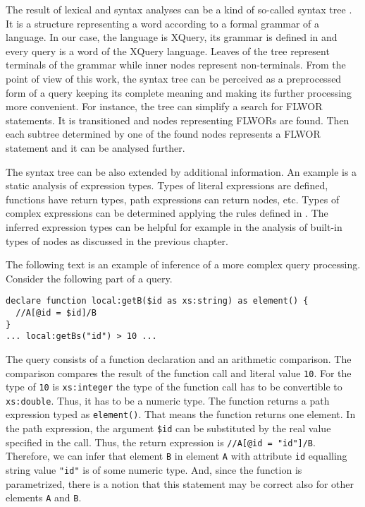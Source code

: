 The result of lexical and syntax analyses can be a kind of so-called syntax tree \cite{compilers}. It is a structure representing a word according to a formal grammar of a language. In our case, the language is XQuery, its grammar is defined in \cite{w3c_xquery} and every query is a word of the XQuery language. Leaves of the tree represent terminals of the grammar while inner nodes represent non-terminals. From the point of view of this work, the syntax tree can be perceived as a preprocessed form of a query keeping its complete meaning and making its further processing more convenient. For instance, the tree can simplify a search for FLWOR statements. It is transitioned and nodes representing FLWORs are found. Then each subtree determined by one of the found nodes represents a FLWOR statement and it can be analysed further.

The syntax tree can be also extended by additional information. An example is a static analysis of expression types. Types of literal expressions are defined, functions have return types, path expressions can return nodes, etc. Types of complex expressions can be determined applying the rules defined in \cite{w3c_xquery}. The inferred expression types can be helpful for example in the analysis of built-in types of nodes as discussed in the previous chapter. 

The following text is an example of inference of a more complex query processing. Consider the following part of a query.
\begin{verbatim}
declare function local:getB($id as xs:string) as element() {
  //A[@id = $id]/B
}
... local:getBs("id") > 10 ...
\end{verbatim}
The query consists of a function declaration and an arithmetic comparison. The comparison compares the result of the function call and literal value \texttt{10}. For the type of \texttt{10} is \texttt{xs:integer} the type of the function call has to be convertible to \texttt{xs:double}. Thus, it has to be a numeric type. The function returns a path expression typed as \texttt{element()}. That means the function returns one element. In the path expression, the argument \texttt{\$id} can be substituted by the real value specified in the call. Thus, the return expression is \texttt{//A[@id = "id"]/B}. Therefore, we can infer that element \texttt{B} in element \texttt{A} with attribute \texttt{id} equalling string value \texttt{"id"} is of some numeric type. And, since the function is parametrized, there is a notion that this statement may be correct also for other elements \texttt{A} and \texttt{B}.

